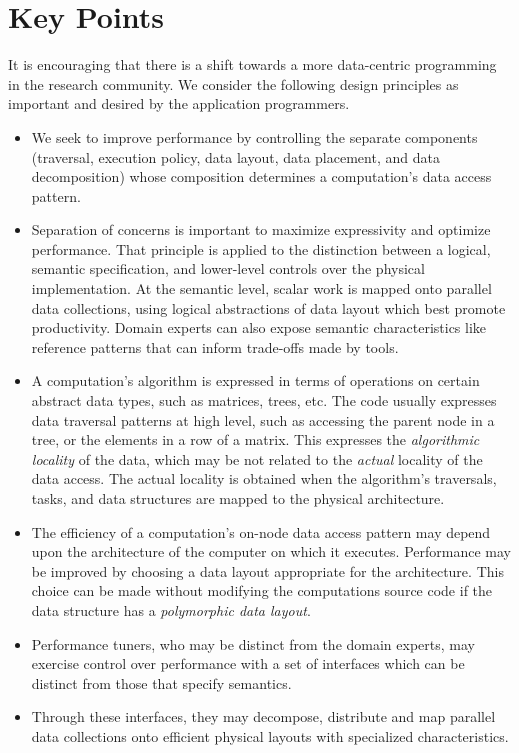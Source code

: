   
  
\section{Key Points}
It is encouraging that there is a shift towards a more data-centric programming in the research community. 
We consider the following design principles as important and desired by the application programmers.

\begin{itemize}
\item We seek to improve performance by controlling the separate components (traversal, execution policy, data layout, data placement, and data decomposition) whose composition determines a computation's data access pattern. 
%
\item Separation of concerns is important to maximize expressivity and optimize performance. That principle is applied to the distinction between a logical, semantic specification, and lower-level controls over the physical implementation.
 At the semantic level, scalar work is mapped onto parallel data collections, using logical abstractions of data layout which best promote productivity. Domain experts can also expose semantic characteristics like reference patterns that can inform trade-offs made by tools.
%
\item A computation's algorithm is expressed in terms of operations on certain abstract data types, such as matrices, trees, etc. The code usually expresses data traversal patterns at high level, such as accessing the parent node in a tree, or the elements in a row of a matrix. This expresses the {\em algorithmic locality} of the data, which may be not related to the {\em actual} locality of the data access.  The actual locality is obtained when the algorithm's traversals, tasks, and data structures are mapped to the physical architecture. \
%
\item The efficiency of a computation's on-node data access pattern may depend upon the architecture of the computer on which it executes.  Performance may be improved by choosing a data layout appropriate for the architecture.  This choice can be made without modifying the computations source code if the data structure has a {\em polymorphic data layout}.
%
\item Performance tuners, who may be distinct from the domain experts, may exercise control over performance with a set of interfaces which can be distinct from those that specify semantics. 
%
\item Through these interfaces, they may decompose, distribute and map parallel data collections onto efficient physical layouts with specialized characteristics.
\end{itemize}

